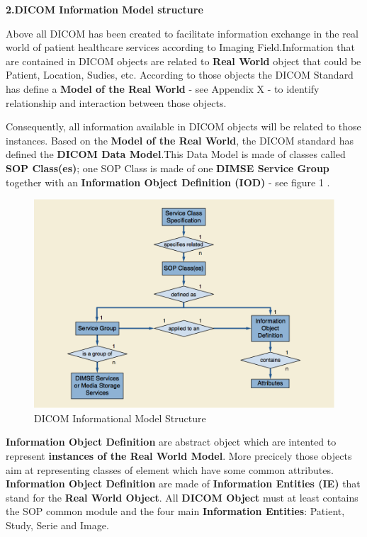 \textbf{2.DICOM Information Model structure}

\newline \vspace{5mm}
Above all DICOM has been created to facilitate information exchange in the real world of patient healthcare services according to Imaging Field.Information that are contained in DICOM objects are related to \textbf{Real World} object that could be Patient, Location, Sudies, etc. According to those objects the DICOM Standard has define a \textbf{Model of the Real World} - see Appendix X - to identify relationship and interaction between those objects. 

\newline \vspace{5mm}
Consequently, all information available in DICOM objects will be related to those instances. Based on the \textbf{Model of the Real World}, the DICOM standard has defined the \textbf{DICOM Data Model}.This Data Model is made of classes called \textbf{SOP Class(es)}; one SOP Class is made of one \textbf{DIMSE Service Group} together with an \textbf{Information Object Definition (IOD)} - see figure 1 .\\

\begin{figure}[ht]
\centering
\includegraphics[width = 0.8\hsize]{./figures/DICOMInformationalModel}
\caption{DICOM Informational Model Structure}
\end{figure}

\textbf{Information Object Definition} are abstract object which are intented to represent \textbf{instances of the Real World Model}. More precicely those objects aim at representing classes of element which have some common attributes. \textbf{Information Object Definition}  are made of \textbf{Information Entities (IE)} that stand for the \textbf{Real World Object}. All \textbf{DICOM Object} must at least contains the SOP common module and the four main \textbf{Information Entities}: Patient, Study, Serie and Image.\\

